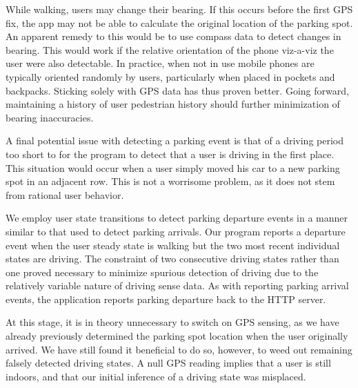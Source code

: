 While walking, users may change their bearing.  If this occurs before the
first GPS fix, the app may not be able to calculate the original location
of the parking spot.  An apparent remedy to this would be to use compass
data to detect changes in bearing.  This would work if the relative
orientation of the phone viz-a-viz the user were also detectable.  In
practice, when not in use mobile phones are typically oriented randomly by
users, particularly when placed in pockets and backpacks.  Sticking solely
with GPS data has thus proven better.  Going forward, maintaining a history
of user pedestrian history should further minimization of bearing
inaccuracies.

A final potential issue with detecting a parking event is that of a driving
period too short to for the program to detect that a user is driving in
the first place.  This situation would occur when a user simply moved his
car to a new parking spot in an adjacent row.  This is not a worrisome
problem, as it does not stem from rational user behavior.

We employ user state transitions to detect parking departure events in a 
manner similar to that used to detect parking arrivals.  Our program
reports a departure event when the user steady state is walking but the
two most recent individual states are driving.  The constraint of two
consecutive driving states rather than one proved necessary to minimize
spurious detection of driving due to the relatively variable nature of
driving sense data.  As with reporting parking arrival events, the
application reports parking departure back to the HTTP server.

At this stage, it is in theory unnecessary to switch on GPS sensing, as
we have already previously determined the parking spot location when the
user originally arrived.  We have still found it beneficial to do so,
however, to weed out remaining falsely detected driving states.  A null
GPS reading implies that a user is still indoors, and that our initial
inference of a driving state was misplaced.


